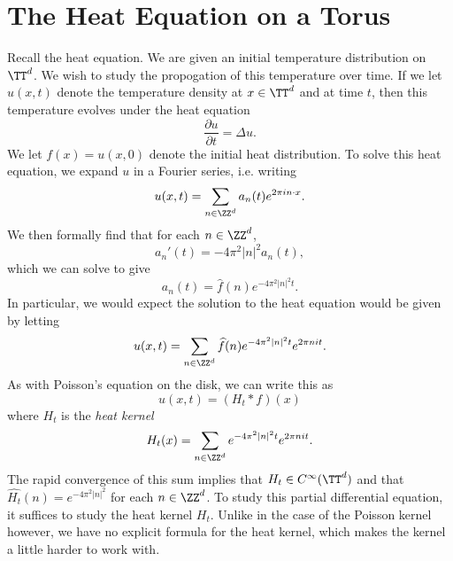 \section{The Heat Equation on a Torus}

Recall the heat equation. We are given an initial temperature distribution on $\TT^d$. We wish to study the propogation of this temperature over time. If we let $u(x,t)$ denote the temperature density at $x \in \TT^d$ and at time $t$, then this temperature evolves under the heat equation
%
\[ \frac{\partial u}{\partial t} = \Delta u. \]
%
We let $f(x) = u(x,0)$ denote the initial heat distribution. To solve this heat equation, we expand $u$ in a Fourier series, i.e. writing
%
\[ u(x,t) = \sum_{n \in \ZZ^d} a_n(t) e^{2 \pi i n \cdot x}. \]
%
We then formally find that for each $n \in \ZZ^d$,
%
\[ a_n'(t) = - 4 \pi^2 |n|^2 a_n(t), \]
%
which we can solve to give
%
\[ a_n(t) = \widehat{f}(n) e^{- 4 \pi^2 |n|^2 t}. \]
%
In particular, we would expect the solution to the heat equation would be given by letting
%
\[ u(x,t) = \sum_{n \in \ZZ^d} \widehat{f}(n) e^{-4 \pi^2 |n|^2 t} e^{2 \pi n i t}. \]
%
As with Poisson's equation on the disk, we can write this as
%
\[ u(x,t) = (H_t * f)(x) \]
%
where $H_t$ is the \emph{heat kernel}
%
\[ H_t(x) = \sum_{n \in \ZZ^d} e^{- 4 \pi^2 |n|^2 t} e^{2 \pi n i t}. \]
%
The rapid convergence of this sum implies that $H_t \in C^\infty(\TT^d)$ and that $\widehat{H_t}(n) = e^{-4\pi^2 |n|^2}$ for each $n \in \ZZ^d$. To study this partial differential equation, it suffices to study the heat kernel $H_t$. Unlike in the case of the Poisson kernel however, we have no explicit formula for the heat kernel, which makes the kernel a little harder to work with.

